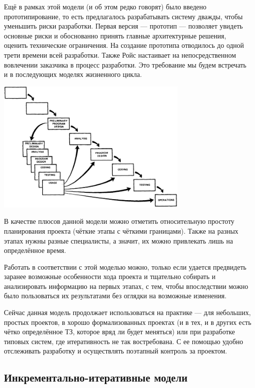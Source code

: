 \documentclass{../../text-style}
\begin{document}
Ещё в рамках этой модели (и об этом редко говорят) было введено прототипирование, то есть предлагалось разрабатывать систему дважды, чтобы уменьшить риски разработки. Первая версия --- прототип --- позволяет увидеть основные риски и обоснованно принять главные архитектурные решения, оценить технические ограничения. На создание прототипа отводилось до одной трети времени всей разработки. Также Ройс настаивает на непосредственном вовлечении заказчика в процесс разработки. Это требование мы будем встречать и в последующих моделях жизненного цикла.

\begin{center}
    \includegraphics[width=0.7\textwidth]{waterfallPrototyping.png}
\end{center}

В качестве плюсов данной модели можно отметить относительную простоту планирования проекта (чёткие этапы с чёткими границами). Также на разных этапах нужны разные специалисты, а значит, их можно привлекать лишь на определённое время.

Работать в соответствии с этой моделью можно, только если удается предвидеть заранее возможные особенности хода проекта и тщательно собирать и анализировать информацию на первых этапах, с тем, чтобы впоследствии можно было пользоваться их результатами без оглядки на возможные изменения.

Сейчас данная модель продолжает использоваться на практике --- для небольших, простых проектов, в хорошо формализованных проектах (и в тех, и в других есть чётко определённое ТЗ, которое вряд ли будет меняться) или при разработке типовых систем, где итеративность не так востребована. С ее помощью удобно отслеживать разработку и осуществлять поэтапный контроль за проектом.

\subsection{Инкрементально-итеративные модели}
\end{document}
